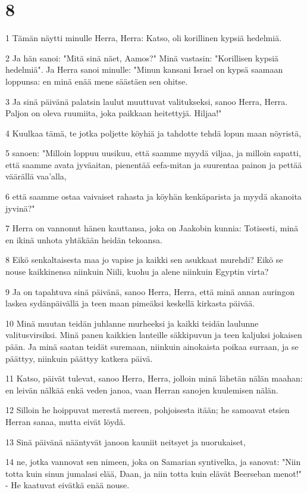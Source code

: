 \chapter{8}

\par 1 Tämän näytti minulle Herra, Herra: Katso, oli korillinen kypsiä hedelmiä.
\par 2 Ja hän sanoi: "Mitä sinä näet, Aamos?" Minä vastasin: "Korillisen kypsiä hedelmiä". Ja Herra sanoi minulle: "Minun kansani Israel on kypsä saamaan loppunsa: en minä enää mene säästäen sen ohitse.
\par 3 Ja sinä päivänä palatsin laulut muuttuvat valitukseksi, sanoo Herra, Herra. Paljon on oleva ruumiita, joka paikkaan heitettyjä. Hiljaa!"
\par 4 Kuulkaa tämä, te jotka poljette köyhiä ja tahdotte tehdä lopun maan nöyristä,
\par 5 sanoen: "Milloin loppuu uusikuu, että saamme myydä viljaa, ja milloin sapatti, että saamme avata jyväaitan, pienentää eefa-mitan ja suurentaa painon ja pettää väärällä vaa'alla,
\par 6 että saamme ostaa vaivaiset rahasta ja köyhän kenkäparista ja myydä akanoita jyvinä?"
\par 7 Herra on vannonut hänen kauttansa, joka on Jaakobin kunnia: Totisesti, minä en ikinä unhota yhtäkään heidän tekoansa.
\par 8 Eikö senkaltaisesta maa jo vapise ja kaikki sen asukkaat murehdi? Eikö se nouse kaikkinensa niinkuin Niili, kuohu ja alene niinkuin Egyptin virta?
\par 9 Ja on tapahtuva sinä päivänä, sanoo Herra, Herra, että minä annan auringon laskea sydänpäivällä ja teen maan pimeäksi keskellä kirkasta päivää.
\par 10 Minä muutan teidän juhlanne murheeksi ja kaikki teidän laulunne valitusvirsiksi. Minä panen kaikkien lanteille säkkipuvun ja teen kaljuksi jokaisen pään. Ja minä saatan teidät suremaan, niinkuin ainokaista poikaa surraan, ja se päättyy, niinkuin päättyy katkera päivä.
\par 11 Katso, päivät tulevat, sanoo Herra, Herra, jolloin minä lähetän nälän maahan: en leivän nälkää enkä veden janoa, vaan Herran sanojen kuulemisen nälän.
\par 12 Silloin he hoippuvat merestä mereen, pohjoisesta itään; he samoavat etsien Herran sanaa, mutta eivät löydä.
\par 13 Sinä päivänä nääntyvät janoon kauniit neitsyet ja nuorukaiset,
\par 14 ne, jotka vannovat sen nimeen, joka on Samarian syntivelka, ja sanovat: "Niin totta kuin sinun jumalasi elää, Daan, ja niin totta kuin elävät Beerseban menot!" - He kaatuvat eivätkä enää nouse.

